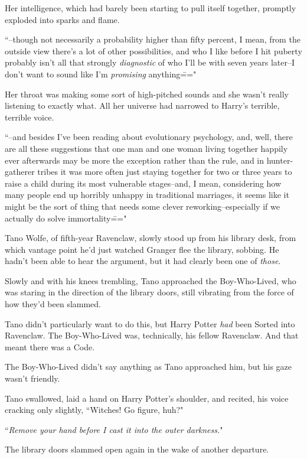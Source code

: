 Her intelligence, which had barely been starting to pull itself together, promptly exploded into sparks and flame.

``\---though not necessarily a probability higher than fifty percent, I mean, from the outside view there's a lot of other possibilities, and who I like before I hit puberty probably isn't all that strongly \emph{diagnostic} of who I'll be with seven years later\---I don't want to sound like I'm \emph{promising} anything\==="

Her throat was making some sort of high-pitched sounds and she wasn't really listening to exactly what. All her universe had narrowed to Harry's terrible, terrible voice.

``\---and besides I've been reading about evolutionary psychology, and, well, there are all these suggestions that one man and one woman living together happily ever afterwards may be more the exception rather than the rule, and in hunter-gatherer tribes it was more often just staying together for two or three years to raise a child during its most vulnerable stages\---and, I mean, considering how many people end up horribly unhappy in traditional marriages, it seems like it might be the sort of thing that needs some clever reworking\---especially if we actually do solve immortality\==="

\later

Tano Wolfe, of fifth-year Ravenclaw, slowly stood up from his library desk, from which vantage point he'd just watched Granger flee the library, sobbing. He hadn't been able to hear the argument, but it had clearly been one of \emph{those}.

Slowly and with his knees trembling, Tano approached the Boy-Who-Lived, who was staring in the direction of the library doors, still vibrating from the force of how they'd been slammed.

Tano didn't particularly want to do this, but Harry Potter \emph{had} been Sorted into Ravenclaw. The Boy-Who-Lived was, technically, his fellow Ravenclaw. And that meant there was a Code.

The Boy-Who-Lived didn't say anything as Tano approached him, but his gaze wasn't friendly.

Tano swallowed, laid a hand on Harry Potter's shoulder, and recited, his voice cracking only slightly, ``Witches! Go figure, huh?"

``\emph{Remove your hand before I cast it into the outer darkness.}"

The library doors slammed open again in the wake of another departure.

